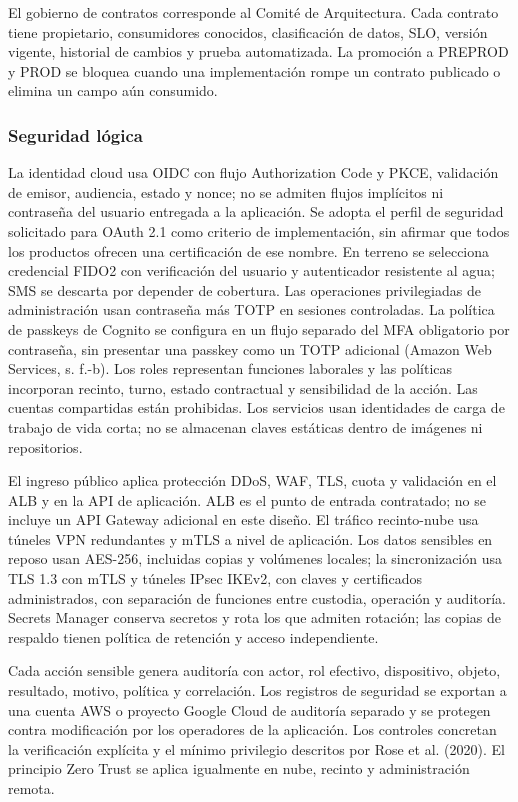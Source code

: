\documentclass[11pt,letterpaper]{report}
\begin{document}
El gobierno de contratos corresponde al Comité de Arquitectura. Cada contrato tiene propietario, consumidores conocidos, clasificación de datos, SLO, versión vigente, historial de cambios y prueba automatizada. La promoción a PREPROD y PROD se bloquea cuando una implementación rompe un contrato publicado o elimina un campo aún consumido.

\subsubsection*{Seguridad lógica}

La identidad cloud usa OIDC con flujo Authorization Code y PKCE, validación de emisor, audiencia, estado y nonce; no se admiten flujos implícitos ni contraseña del usuario entregada a la aplicación. Se adopta el perfil de seguridad solicitado para OAuth 2.1 como criterio de implementación, sin afirmar que todos los productos ofrecen una certificación de ese nombre. En terreno se selecciona credencial FIDO2 con verificación del usuario y autenticador resistente al agua; SMS se descarta por depender de cobertura. Las operaciones privilegiadas de administración usan contraseña más TOTP en sesiones controladas. La política de passkeys de Cognito se configura en un flujo separado del MFA obligatorio por contraseña, sin presentar una passkey como un TOTP adicional (Amazon Web Services, s. f.-b). Los roles representan funciones laborales y las políticas incorporan recinto, turno, estado contractual y sensibilidad de la acción. Las cuentas compartidas están prohibidas. Los servicios usan identidades de carga de trabajo de vida corta; no se almacenan claves estáticas dentro de imágenes ni repositorios.

El ingreso público aplica protección DDoS, WAF, TLS, cuota y validación en el ALB y en la API de aplicación. ALB es el punto de entrada contratado; no se incluye un API Gateway adicional en este diseño. El tráfico recinto-nube usa túneles VPN redundantes y mTLS a nivel de aplicación. Los datos sensibles en reposo usan AES-256, incluidas copias y volúmenes locales; la sincronización usa TLS 1.3 con mTLS y túneles IPsec IKEv2, con claves y certificados administrados, con separación de funciones entre custodia, operación y auditoría. Secrets Manager conserva secretos y rota los que admiten rotación; las copias de respaldo tienen política de retención y acceso independiente.

Cada acción sensible genera auditoría con actor, rol efectivo, dispositivo, objeto, resultado, motivo, política y correlación. Los registros de seguridad se exportan a una cuenta AWS o proyecto Google Cloud de auditoría separado y se protegen contra modificación por los operadores de la aplicación. Los controles concretan la verificación explícita y el mínimo privilegio descritos por Rose et al. (2020). El principio Zero Trust se aplica igualmente en nube, recinto y administración remota.
\end{document}
